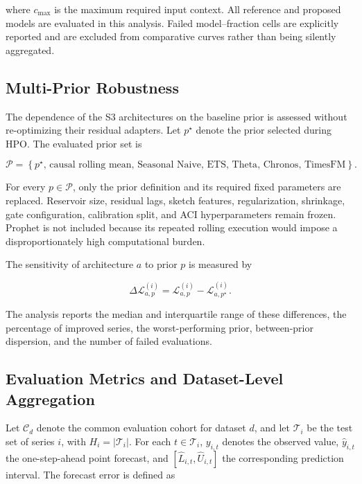 \documentclass[review,number,sort&compress]{elsarticle}
\begin{document}
where \(c_{\max}\) is the maximum required input context. All reference and proposed models are evaluated in this analysis. Failed model--fraction cells are explicitly reported and are excluded from comparative curves rather than being silently aggregated.

\subsection{Multi-Prior Robustness}
\label{subsec:multiprior}

The dependence of the S3 architectures on the baseline prior is assessed without re-optimizing their residual adapters. Let \(p^\star\) denote the prior selected during HPO. The evaluated prior set is

\begin{equation}
\mathcal{P}
=
\left\{
p^\star,\,
\text{causal rolling mean},\,
\text{Seasonal Naive},\,
\text{ETS},\,
\text{Theta},\,
\text{Chronos},\,
\text{TimesFM}
\right\}.
\end{equation}

For every \(p\in\mathcal{P}\), only the prior definition and its required fixed parameters are replaced. Reservoir size, residual lags, sketch features, regularization, shrinkage, gate configuration, calibration split, and ACI hyperparameters remain frozen. Prophet is not included because its repeated rolling execution would impose a disproportionately high computational burden.

The sensitivity of architecture \(a\) to prior \(p\) is measured by

\begin{equation}
\Delta\mathcal{L}_{a,p}^{(i)}
=
\mathcal{L}_{a,p}^{(i)}
-
\mathcal{L}_{a,p^\star}^{(i)}.
\label{eq:multiprior_delta}
\end{equation}

The analysis reports the median and interquartile range of these differences, the percentage of improved series, the worst-performing prior, between-prior dispersion, and the number of failed evaluations.



\subsection{Evaluation Metrics and Dataset-Level Aggregation}
\label{subsec:evaluation_metrics}

Let $\mathcal{C}_d$ denote the common evaluation cohort for dataset $d$, and let $\mathcal{T}_i$ be the test set of series $i$, with $H_i=|\mathcal{T}_i|$. For each $t\in\mathcal{T}_i$, $y_{i,t}$ denotes the observed value, $\widehat{y}_{i,t}$ the one-step-ahead point forecast, and $[\widehat{L}_{i,t},\widehat{U}_{i,t}]$ the corresponding prediction interval. The forecast error is defined as
\end{document}
